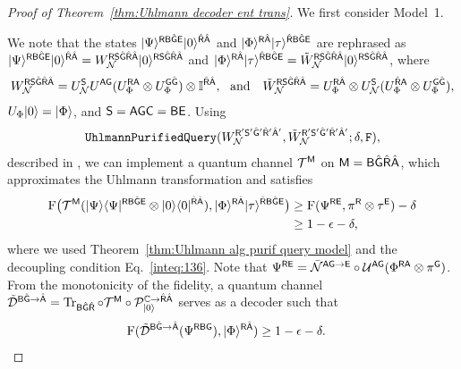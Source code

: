 \begin{proof}[Proof of Theorem~\ref{thm:Uhlmann decoder ent trans}]
    

We first consider Model~1.


We note that the states $\ket{\Psi}^{\sR\sB\hat{\sG}\sE}\ket{0}^{\hat{\sR}\hat{\sA}}$ and $\ket{\Phi}^{\sR\hat{\sA}}\ket{\tau}^{\hat{\sR}\sB\hat{\sG}\sE}$ are rephrased as 
$\ket{\Psi}^{\sR\sB\hat{\sG}\sE}\ket{0}^{\hat{\sR}\hat{\sA}} = W_\cN^{\sR\sS\hat{\sG}\hat{\sR}\hat{\sA}}\ket{0}^{\sR\sS\hat{\sG}\hat{\sR}\hat{\sA}}$ and $\ket{\Phi}^{\sR\hat{\sA}}\ket{\tau}^{\hat{\sR}\sB\hat{\sG}\sE} = \til{W}_\cN^{\sR\sS\hat{\sG}\hat{\sR}\hat{\sA}}\ket{0}^{\sR\sS\hat{\sG}\hat{\sR}\hat{\sA}}$, where
\begin{align}
    W_\cN^{\sR\sS\hat{\sG}\hat{\sR}\hat{\sA}} = U_\cN^{\sS}U^{\sA\sG}(U_\Phi^{\sR\sA}\otimes U_\Phi^{\sG\hat{\sG}})\otimes \bI^{\hat{\sR}\hat{\sA}}, \ \ \text{and} \ \ \ 
    \til{W}_\cN^{\sR\sS\hat{\sG}\hat{\sR}\hat{\sA}} = U_\Phi^{\sR\hat{\sA}} \otimes U_\cN^{\sS}(U_\Phi^{\hat{\sR}\sA}\otimes U_\Phi^{\sG\hat{\sG}}),
\end{align}
$U_\Phi\ket{0} = \ket{\Phi}$, and $\sS = \sA\sG\sC = \sB\sE$.
Using
\begin{align}
    \mathtt{UhlmannPurifiedQuery}(W_\cN^{\sR'\sS'\hat{\sG}'\hat{\sR}'\hat{\sA}'}, \til{W}_\cN^{\sR'\sS'\hat{\sG}'\hat{\sR}'\hat{\sA}'}; \delta, \tF),
\end{align}
described in , we can implement a quantum channel $\cT^\sM$ on $\sM = \sB\hat{\sG}\hat{\sR}\hat{\sA}$, which approximates the Uhlmann transformation and satisfies
\begin{align}
    \rF\big(\cT^\sM(\ketbra{\Psi}{\Psi}^{\sR\sB\hat{\sG}\sE}\otimes\ketbra{0}{0}^{\hat{\sR}\hat{\sA}}), \ket{\Phi}^{\sR\hat{\sA}}\ket{\tau}^{\hat{\sR}\sB\hat{\sG}\sE}\big)
    &\geq \rF(\Psi^{\sR\sE}, \pi^\sR\otimes\tau^\sE) -\delta \\
    &\geq 1-\epsilon - \delta,
\end{align}
where we used Theorem~\ref{thm:Uhlmann alg purif query model} and the decoupling condition Eq.~\eqref{inteq:136}.
Note that $\Psi^{\sR\sE} = \bar{\cN}^{\sA\sG\rarr\sE}\circ\cU^{\sA\sG}(\Phi^{\sR\sA} \otimes \pi^\sG)$.
From the monotonicity of the fidelity, a quantum channel $\til{\cD}^{\sB\hat{\sG}\rarr\hat{\sA}} = \tr_{\sB\hat{\sG}\hat{\sR}}\circ\cT^\sM \circ \cP_{\ket{0}}^{\bC\rarr\hat{\sR}\hat{\sA}}$ serves as a decoder such that
\begin{align}
    &\rF(\til{\cD}^{\sB\hat{\sG}\rarr\hat{\sA}}(\Psi^{\sR\sB\sG}), \ket{\Phi}^{\sR\hat{\sA}}) 
    \geq 1 - \epsilon - \delta.
\end{align}



\end{proof}
